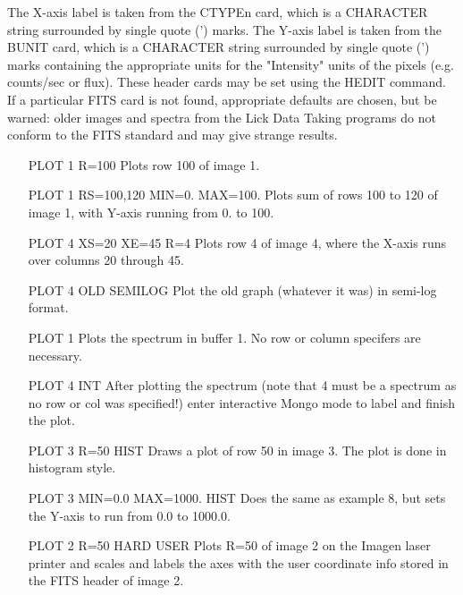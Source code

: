 The X-axis label is taken from the CTYPEn card, which is a CHARACTER string
surrounded by single quote (') marks.  The Y-axis label is taken from the
BUNIT card, which is a CHARACTER string surrounded by single quote (')
marks containing the appropriate units for the "Intensity" units of the
pixels (e.g. counts/sec or flux).  These header cards may be set using the
HEDIT command.  If a particular FITS card is not found, appropriate
defaults are chosen, but be warned: older images and spectra from the Lick
Data Taking programs do not conform to the FITS standard and may give
strange results.

\begin{itemize}
  \item[PLOT 1 R=100]{Plots row 100 of image 1.}
  \item[PLOT 1 RS=100,120 MIN=0. MAX=100.]{  Plots sum of rows 100 to
       120 of image 1, with Y-axis running from 0. to 100.}
  \item[PLOT 4 XS=20 XE=45 R=4]{Plots row 4 of image 4,
       where the X-axis runs over columns 20 through 45.}
  \item[PLOT 4 OLD SEMILOG]{Plot the old graph (whatever it was)
       in semi-log format.}
  \item[PLOT 1]{Plots the spectrum in buffer 1.  No
       row or column specifers are necessary.}
  \item[PLOT 4 INT ]{After plotting the spectrum (note that 4
       must be a spectrum as no row or col was
       specified!) enter interactive Mongo mode
       to label and finish the plot.}
  \item[PLOT 3 R=50 HIST]{Draws a plot of row 50 in image 3.
       The plot is d}one in histogram style.
  \item[PLOT 3 MIN=0.0 MAX=1000. HIST]{Does the same as example
       8, but sets the Y-axis to run from 0.0 to 1000.0.}
  \item[PLOT 2 R=50 HARD USER]{Plots R=50 of image 2 on the Imagen laser
       printer and scales and labels the axes with
       the user coordinate info stored in the FITS header of image 2.}
\end{itemize}

